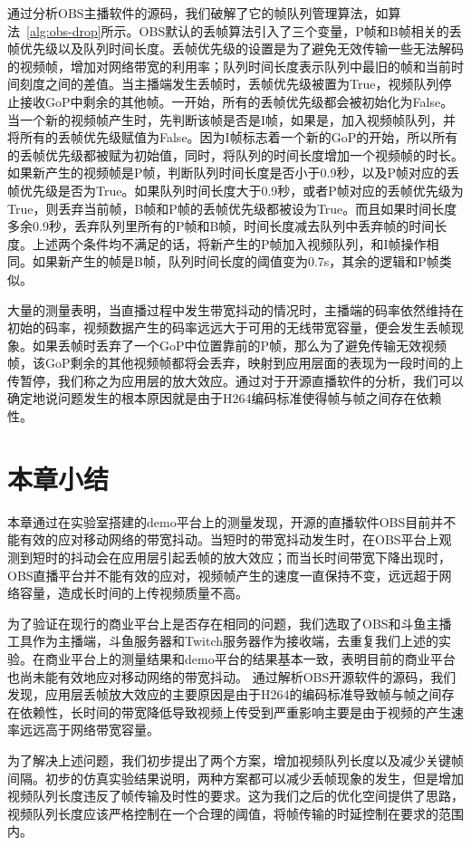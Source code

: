 通过分析OBS主播软件的源码，我们破解了它的帧队列管理算法，如算法~\ref{alg:obs-drop}所示。OBS默认的丢帧算法引入了三个变量，P帧和B帧相关的丢帧优先级以及队列时间长度。丢帧优先级的设置是为了避免无效传输一些无法解码的视频帧，增加对网络带宽的利用率；队列时间长度表示队列中最旧的帧和当前时间刻度之间的差值。当主播端发生丢帧时，丢帧优先级被置为True，视频队列停止接收GoP中剩余的其他帧。一开始，所有的丢帧优先级都会被初始化为False。当一个新的视频帧产生时，先判断该帧是否是I帧，如果是，加入视频帧队列，并将所有的丢帧优先级赋值为False。因为I帧标志着一个新的GoP的开始，所以所有的丢帧优先级都被赋为初始值，同时，将队列的时间长度增加一个视频帧的时长。如果新产生的视频帧是P帧，判断队列时间长度是否小于0.9秒，以及P帧对应的丢帧优先级是否为True。如果队列时间长度大于0.9秒，或者P帧对应的丢帧优先级为True，则丢弃当前帧，B帧和P帧的丢帧优先级都被设为True。而且如果时间长度多余0.9秒，丢弃队列里所有的P帧和B帧，时间长度减去队列中丢弃帧的时间长度。上述两个条件均不满足的话，将新产生的P帧加入视频队列，和I帧操作相同。如果新产生的帧是B帧，队列时间长度的阈值变为0.7s，其余的逻辑和P帧类似。

大量的测量表明，当直播过程中发生带宽抖动的情况时，主播端的码率依然维持在初始的码率，视频数据产生的码率远远大于可用的无线带宽容量，便会发生丢帧现象。如果丢帧时丢弃了一个GoP中位置靠前的P帧，那么为了避免传输无效视频帧，该GoP剩余的其他视频帧都将会丢弃，映射到应用层面的表现为一段时间的上传暂停，我们称之为应用层的放大效应。通过对于开源直播软件的分析，我们可以确定地说问题发生的根本原因就是由于H264编码标准使得帧与帧之间存在依赖性。

\section{本章小结}
本章通过在实验室搭建的demo平台上的测量发现，开源的直播软件OBS目前并不能有效的应对移动网络的带宽抖动。当短时的带宽抖动发生时，在OBS平台上观测到短时的抖动会在应用层引起丢帧的放大效应；而当长时间带宽下降出现时，OBS直播平台并不能有效的应对，视频帧产生的速度一直保持不变，远远超于网络容量，造成长时间的上传视频质量不高。

为了验证在现行的商业平台上是否存在相同的问题，我们选取了OBS和斗鱼主播工具作为主播端，斗鱼服务器和Twitch服务器作为接收端，去重复我们上述的实验。在商业平台上的测量结果和demo平台的结果基本一致，表明目前的商业平台也尚未能有效地应对移动网络的带宽抖动。 通过解析OBS开源软件的源码，我们发现，应用层丢帧放大效应的主要原因是由于H264的编码标准导致帧与帧之间存在依赖性，长时间的带宽降低导致视频上传受到严重影响主要是由于视频的产生速率远远高于网络带宽容量。

为了解决上述问题，我们初步提出了两个方案，增加视频队列长度以及减少关键帧间隔。初步的仿真实验结果说明，两种方案都可以减少丢帧现象的发生，但是增加视频队列长度违反了帧传输及时性的要求。这为我们之后的优化空间提供了思路，视频队列长度应该严格控制在一个合理的阈值，将帧传输的时延控制在要求的范围内。